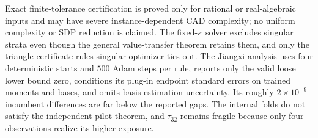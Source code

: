 Exact finite-tolerance certification is proved only for rational or real-algebraic inputs and may have severe instance-dependent CAD complexity; no uniform complexity or SDP reduction is claimed.  The fixed-\(\kappa\) solver excludes singular strata even though the general value-transfer theorem retains them, and only the triangle certificate rules singular optimizer ties out.  The Jiangxi analysis uses four deterministic starts and \(500\) Adam steps per rule, reports only the valid loose lower bound zero, conditions its plug-in endpoint standard errors on trained moments and bases, and omits basis-estimation uncertainty.  Its roughly \(2\times10^{-9}\) incumbent differences are far below the reported gaps.  The internal folds do not satisfy the independent-pilot theorem, and \(\tau_{32}\) remains fragile because only four observations realize its higher exposure.